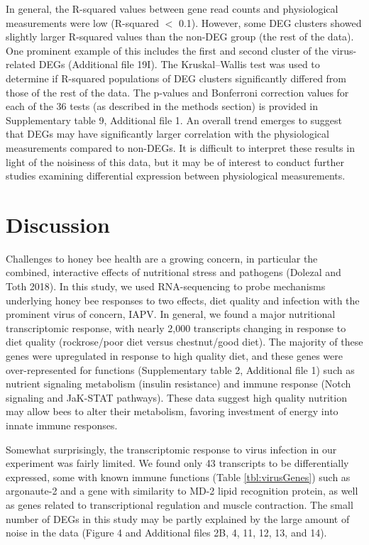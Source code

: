 \documentclass{bmcart}
\begin{document}
\begin{linenumbers}
\begin{doublespacing}
In general, the R-squared values between gene read counts and physiological measurements were low (R-squared $<$ 0.1). However, some DEG clusters showed slightly larger R-squared values than the non-DEG group (the rest of the data). One prominent example of this includes the first and second cluster of the virus-related DEGs (Additional file 19I). The Kruskal–Wallis test was used to determine if R-squared populations of DEG clusters significantly differed from those of the rest of the data. The p-values and Bonferroni correction values for each of the 36 tests (as described in the methods section) is provided in Supplementary table 9, Additional file 1. An overall trend emerges to suggest that DEGs may have significantly larger correlation with the physiological measurements compared to non-DEGs. It is difficult to interpret these results in light of the noisiness of this data, but it may be of interest to conduct further studies examining differential expression between physiological measurements. 

\section*{Discussion}

Challenges to honey bee health are a growing concern, in particular the combined, interactive effects of nutritional stress and pathogens (Dolezal and Toth 2018). In this study, we used RNA-sequencing to probe mechanisms underlying honey bee responses to two effects, diet quality and infection with the prominent virus of concern, IAPV. In general, we found a major nutritional transcriptomic response, with nearly 2,000 transcripts changing in response to diet quality (rockrose/poor diet versus chestnut/good diet). The majority of these genes were upregulated in response to high quality diet, and these genes were over-represented for functions (Supplementary table 2, Additional file 1) such as nutrient signaling metabolism (insulin resistance) and immune response (Notch signaling and JaK-STAT pathways). These data suggest high quality nutrition may allow bees to alter their metabolism, favoring investment of energy into innate immune responses.

Somewhat surprisingly, the transcriptomic response to virus infection in our experiment was fairly limited. We found only 43 transcripts to be differentially expressed, some with known immune functions (Table \ref{tbl:virusGenes}) such as argonaute-2 and a gene with similarity to MD-2 lipid recognition protein, as well as genes related to transcriptional regulation and muscle contraction. The small number of DEGs in this study may be partly explained by the large amount of noise in the data (Figure 4 and Additional files 2B, 4, 11, 12, 13, and 14).


\end{doublespacing}
\end{linenumbers}
\end{document}
